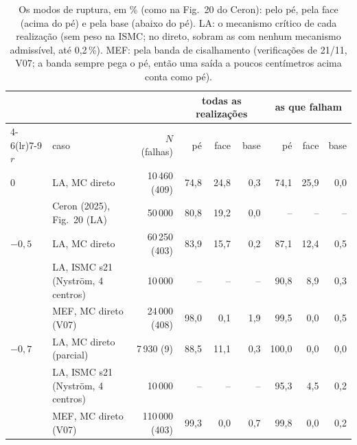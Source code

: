 \begin{table}[H]\centering\footnotesize\setlength{\tabcolsep}{4pt}
\caption{Os modos de ruptura, em \% (como na Fig.~20 do Ceron): pelo pé, pela face (acima do pé) e pela base (abaixo do pé). LA: o mecanismo crítico de cada realização (sem peso na ISMC; no direto, sobram as com nenhum mecanismo admissível, até 0,2\,\%). MEF: pela banda de cisalhamento (verificações de 21/11, V07; a banda sempre pega o pé, então uma saída a poucos centímetros acima conta como pé).}\label{tab:lamodos}
\begin{tabular}{llrrrrrrr}\toprule
 & & & \multicolumn{3}{c}{todas as realizações} & \multicolumn{3}{c}{as que falham} \\\cmidrule(lr){4-6}\cmidrule(lr){7-9}
$r$ & caso & $N$ (falhas) & pé & face & base & pé & face & base \\\midrule
$0$ & LA, MC direto & 10\,460 (409) & 74,8 & 24,8 & 0,3 & 74,1 & 25,9 & 0,0 \\
 & Ceron (2025), Fig.~20 (LA) & 50\,000 & 80,8 & 19,2 & 0,0 & -- & -- & -- \\
$-0{,}5$ & LA, MC direto & 60\,250 (403) & 83,9 & 15,7 & 0,2 & 87,1 & 12,4 & 0,5 \\
 & LA, ISMC s21 (Nyström, 4 centros) & 10\,000 & -- & -- & -- & 90,8 & 8,9 & 0,3 \\
 & MEF, MC direto (V07) & 24\,000 (408) & 98,0 & 0,1 & 1,9 & 99,5 & 0,0 & 0,5 \\
$-0{,}7$ & LA, MC direto (parcial) & 7\,930 (9) & 88,5 & 11,1 & 0,3 & 100,0 & 0,0 & 0,0 \\
 & LA, ISMC s21 (Nyström, 4 centros) & 10\,000 & -- & -- & -- & 95,3 & 4,5 & 0,2 \\
 & MEF, MC direto (V07) & 110\,000 (403) & 99,3 & 0,0 & 0,7 & 99,8 & 0,0 & 0,2 \\
\bottomrule\end{tabular}\end{table}
